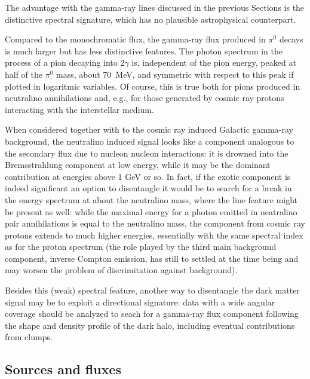 The advantage with the gamma-ray lines discussed in the previous Sections
is the distinctive spectral signature, which has no plausible astrophysical
counterpart. 

Compared to the monochromatic flux, the gamma-ray flux produced in 
$\pi^0$ decays is much larger but has less distinctive features.
The photon spectrum in the process of a pion decaying into $2\gamma$ is, 
independent of the pion energy, peaked at half of the $\pi^0$ mass, 
about 70~MeV, and symmetric with respect to this peak if plotted in 
logaritmic variables. Of course, this is true both for pions produced in 
neutralino annihilations and, e.g., for those generated by cosmic ray 
protons interacting with the interstellar medium.

When considered together with to the cosmic ray induced Galactic gamma-ray
background, the neutralino induced signal looks like a component analogous
to the secondary flux due to nucleon nucleon interactions: it is
drowned into the Bremsstrahlung component at low energy, while it may 
be the dominant contribution at energies above 1 GeV or so. 
In fact, if the exotic component is indeed significant
an option to disentangle it would be to search for a break in the
energy spectrum at about the neutralino mass, where the line feature
might be present as well: while the maximal energy for a photon emitted 
in neatralino pair annihilations is equal to the neutralino mass,
the component from cosmic ray protons extends to much higher energies,
essentially with the same spectral index as for the proton spectrum
(the role played by the third main background component, 
inverse Compton emission, has still to settled at the time being and
may worsen the problem of discrimitation against background).

Besides this (weak) spectral feature, another way to disentangle
the dark matter signal may be to exploit a directional signature:
data with a wide angular coverage should be analyzed to seach for 
a gamma-ray flux component following the shape and density profile 
of the dark halo, including eventual contributions from clumps.


\subsection{Sources and fluxes}

